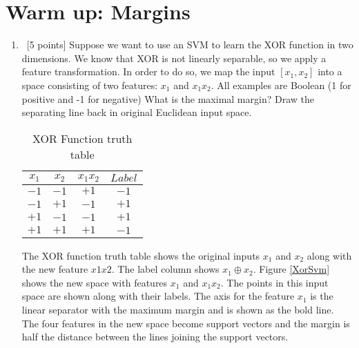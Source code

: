 \section{Warm up: Margins}
\label{sec:q1}

\begin{enumerate}

\item ~[5 points] Suppose we want to use an SVM to learn the XOR
  function in two dimensions. We know that XOR is not linearly
  separable, so we apply a feature transformation. In order to do so,
  we map the input $[x_1, x_2] $ into a space consisting of two
  features: $x_1$ and $x_1 x_2$. All examples are Boolean (1 for
  positive and -1 for negative) What is the maximal margin? Draw the
  separating line back in original Euclidean input space.

  \begin{table}[H]
    \centering
    \begin{tabular}{| c | c | c  |  c | }
      \hline
      $x_1$ & $x_2$  & $x_1x_2$ & $Label$ \\
      \hline
      $-1$ & $-1$ & $+1$ & $-1$\\
      $-1$ & $+1$ & $-1$ & $+1$\\
      $+1$ & $-1$ & $-1$ & $+1$\\
      $+1$ & $+1$ & $+1$ & $-1$\\
      \hline
    \end{tabular}
    \caption*{XOR Function truth table}
  \end{table}

The XOR function truth table shows the original inputs $x_1$ and $x_2$ along with the new feature $x1x2$. The label column shows $x_1 \oplus x_2$. Figure \ref{XorSvm} shows the new space with features $x_1$ and $x_1x_2$. The points in this input space are shown along with their labels. The axis for the feature $x_1$ is the linear separator with the maximum margin and is shown as the bold line. The four features in the new space become support vectors and the margin is half the distance between the lines joining the support vectors.


\end{enumerate}
